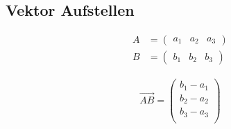 \documentclass[german]{latex4ei/latex4ei_sheet}
\begin{document}
\begin{sectionbox}

\subsection{Vektor Aufstellen}

\begin{minipage}{0.49\textwidth}
\begin{align*}
 A &= \begin{pmatrix} {a}_{1} & {a}_{2} & {a}_{3} \end{pmatrix}  \\ 
 B &= \begin{pmatrix} {b}_{1} & {b}_{2} & {b}_{3} \end{pmatrix}
\end{align*}

\end{minipage}
\begin{minipage}{0.49\textwidth}
\begin{align*}
\overrightarrow{AB} = \begin{pmatrix}
{b}_{1} - {a}_{1} \\
{b}_{2} - {a}_{2} \\
{b}_{3} - {a}_{3} \\
\end{pmatrix}
\end{align*}
\end{minipage}


\end{sectionbox}
\end{document}
